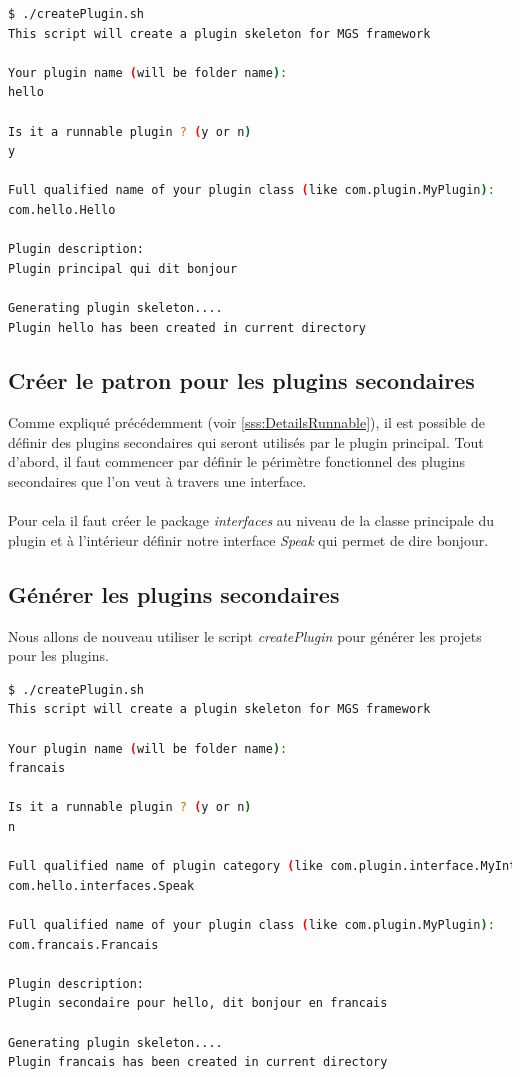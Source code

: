 \documentclass[12pt,a4paper]{article}
\begin{document}
\begin{lstlisting}[language=bash,caption=Création du plugin hello]
$ ./createPlugin.sh 
This script will create a plugin skeleton for MGS framework

Your plugin name (will be folder name):
hello

Is it a runnable plugin ? (y or n)
y

Full qualified name of your plugin class (like com.plugin.MyPlugin):
com.hello.Hello

Plugin description:
Plugin principal qui dit bonjour

Generating plugin skeleton....
Plugin hello has been created in current directory
\end{lstlisting}

\subsection{Créer le patron pour les plugins secondaires}
Comme expliqué précédemment (voir \ref{sss:DetailsRunnable}), il est possible de 
définir des plugins secondaires qui seront utilisés par le plugin principal. 
Tout d'abord, il faut commencer par définir le périmètre fonctionnel des 
plugins secondaires que l'on veut à travers une interface.
\\\\
Pour cela il faut créer le package \emph{interfaces} au niveau de la classe 
principale du plugin et à l'intérieur définir notre interface \emph{Speak} qui 
permet de dire bonjour.

\lstset{language=java,caption=/plugins/hello/src/main/java/com/hello/interfaces/Speak.java}


\subsection{Générer les plugins secondaires}
Nous allons de nouveau utiliser le script \emph{createPlugin} pour générer les 
projets pour les plugins.

\begin{lstlisting}[language=bash,caption=Création du plugin francais]
$ ./createPlugin.sh 
This script will create a plugin skeleton for MGS framework

Your plugin name (will be folder name):
francais

Is it a runnable plugin ? (y or n)
n

Full qualified name of plugin category (like com.plugin.interface.MyInterface):
com.hello.interfaces.Speak

Full qualified name of your plugin class (like com.plugin.MyPlugin):
com.francais.Francais

Plugin description:
Plugin secondaire pour hello, dit bonjour en francais

Generating plugin skeleton....
Plugin francais has been created in current directory
\end{lstlisting}
\end{document}
